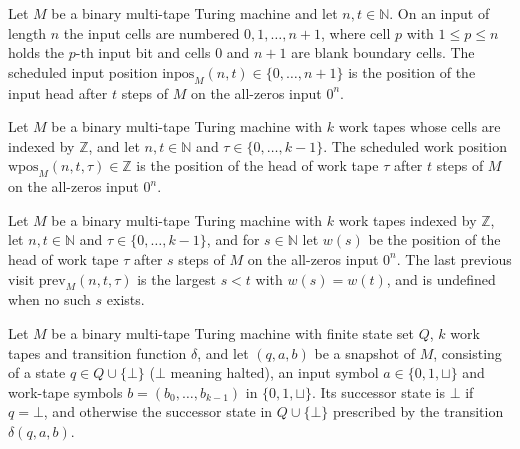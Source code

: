 \begin{definition}
\label{Complexity.inputPosAt}
\leanok
{}
Let $M$ be a binary multi-tape Turing machine and let $n, t \in \mathbb{N}$. On an input of
length $n$ the input cells are numbered $0, 1, \dots, n+1$, where cell $p$ with
$1 \le p \le n$ holds the $p$-th input bit and cells $0$ and $n+1$ are blank boundary cells.
The scheduled input position $\mathrm{inpos}_M(n, t) \in \{0, \dots, n+1\}$ is the position
of the input head after $t$ steps of $M$ on the all-zeros input $0^n$.
\end{definition}

\begin{definition}
\label{Complexity.workPosAt}
\leanok
{}
Let $M$ be a binary multi-tape Turing machine with $k$ work tapes whose cells are indexed by
$\mathbb{Z}$, and let $n, t \in \mathbb{N}$ and $\tau \in \{0, \dots, k-1\}$. The scheduled
work position $\mathrm{wpos}_M(n, t, \tau) \in \mathbb{Z}$ is the position of the head of
work tape $\tau$ after $t$ steps of $M$ on the all-zeros input $0^n$.
\end{definition}

\begin{definition}
\label{Complexity.prevVisit}
\leanok
{}
Let $M$ be a binary multi-tape Turing machine with $k$ work tapes indexed by $\mathbb{Z}$,
let $n, t \in \mathbb{N}$ and $\tau \in \{0, \dots, k-1\}$, and for $s \in \mathbb{N}$ let
$w(s)$ be the position of the head of work tape $\tau$ after $s$ steps of $M$ on the
all-zeros input $0^n$. The last previous visit $\mathrm{prev}_M(n, t, \tau)$ is the largest
$s < t$ with $w(s) = w(t)$, and is undefined when no such $s$ exists.
\end{definition}

\begin{definition}
\label{Complexity.stepState}
\leanok
{}
Let $M$ be a binary multi-tape Turing machine with finite state set $Q$, $k$ work tapes and
transition function $\delta$, and let $(q, a, b)$ be a snapshot of $M$, consisting of a state
$q \in Q \cup \{\bot\}$ ($\bot$ meaning halted), an input symbol $a \in \{0, 1, \sqcup\}$ and
work-tape symbols $b = (b_0, \dots, b_{k-1})$ in $\{0, 1, \sqcup\}$. Its successor state is
$\bot$ if $q = \bot$, and otherwise the successor state in $Q \cup \{\bot\}$ prescribed by
the transition $\delta(q, a, b)$.
\end{definition}

